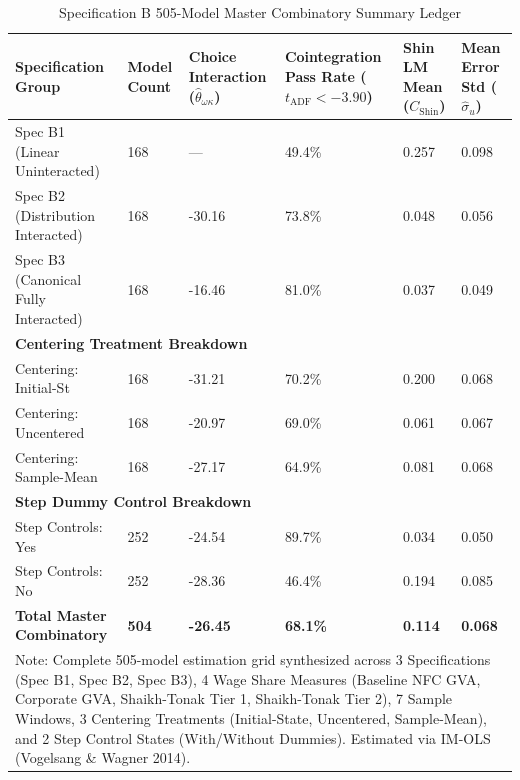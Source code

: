 \begin{table}[H]
\centering
\caption{Specification B 505-Model Master Combinatory Summary Ledger}
\label{tab:specB_master_ledger}
\small
\begin{tabular}{p{4.5cm}p{1.8cm}p{2.2cm}p{2.5cm}p{2.5cm}p{2.5cm}}
\toprule
Specification Group & Model Count & Choice Interaction ($\hat{\theta}_{\omega \kappa}$) & Cointegration Pass Rate ($t_{\text{ADF}} < -3.90$) & Shin LM Mean ($C_{\text{Shin}}$) & Mean Error Std ($\hat{\sigma}_u$) \\
\midrule
Spec B1 (Linear Uninteracted) & 168 & --- & 49.4\% & 0.257 & 0.098 \\
Spec B2 (Distribution Interacted) & 168 & -30.16 & 73.8\% & 0.048 & 0.056 \\
Spec B3 (Canonical Fully Interacted) & 168 & -16.46 & 81.0\% & 0.037 & 0.049 \\
\midrule
\multicolumn{6}{l}{\textbf{Centering Treatment Breakdown}} \\
Centering: Initial-St & 168 & -31.21 & 70.2\% & 0.200 & 0.068 \\
Centering: Uncentered & 168 & -20.97 & 69.0\% & 0.061 & 0.067 \\
Centering: Sample-Mean & 168 & -27.17 & 64.9\% & 0.081 & 0.068 \\
\midrule
\multicolumn{6}{l}{\textbf{Step Dummy Control Breakdown}} \\
Step Controls: Yes & 252 & -24.54 & 89.7\% & 0.034 & 0.050 \\
Step Controls: No & 252 & -28.36 & 46.4\% & 0.194 & 0.085 \\
\midrule
\textbf{Total Master Combinatory} & \textbf{504} & \textbf{-26.45} & \textbf{68.1\%} & \textbf{0.114} & \textbf{0.068} \\
\bottomrule
\multicolumn{6}{p{16.5cm}}{\footnotesize Note: Complete 505-model estimation grid synthesized across 3 Specifications (Spec B1, Spec B2, Spec B3), 4 Wage Share Measures (Baseline NFC GVA, Corporate GVA, Shaikh-Tonak Tier 1, Shaikh-Tonak Tier 2), 7 Sample Windows, 3 Centering Treatments (Initial-State, Uncentered, Sample-Mean), and 2 Step Control States (With/Without Dummies). Estimated via IM-OLS (Vogelsang \& Wagner 2014).}
\end{tabular}
\end{table}
